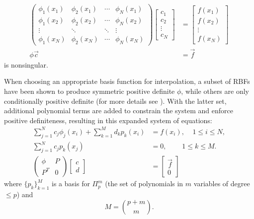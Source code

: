 \documentclass{report}
\begin{document}
{\begin{align*}
          \begin{pmatrix}  
            \phi_1(x_1) & \phi_2(x_1) & \cdots & \phi_N(x_1) \\ 
            \phi_1(x_2) & \phi_2(x_2) & \cdots & \phi_N(x_2) \\ 
            \vdots & \ddots & \ddots & \vdots \\
            \phi_1(x_N) & \phi_2(x_N) & \cdots & \phi_N(x_N)
                \end{pmatrix} 
                \begin{bmatrix} c_1 \\ c_2 \\ \vdots \\ c_N \end{bmatrix}
               &=                \begin{bmatrix} f(x_1) \\ f(x_2) \\ \vdots \\ f(x_N) \end{bmatrix} \\
                         \phi \vec{c} &= \vec{f} 
        \end{align*} 
is nonsingular.

 When choosing an appropriate basis function for interpolation, a
    subset of RBFs have been shown to produce symmetric positive definite
    $\phi$, while others are only conditionally positive definite (for more details see
    \cite{Fasshauer2007}).  With
    the latter set, additional polynomial terms are added to constrain the
    system and enforce positive definiteness, resulting in this expanded system of equations: 
        \begin{align} 
        \sum_{j=1}^{N} c_j \phi_j(x_i) + \sum_{k=1}^{M}d_k p_k(x_i) &= f(x_i),\ \ \ \ \ 1
        \leq i \leq N, \nonumber \\ 
        \sum_{j=1}^{N} c_j p_k(x_j) &=  0,\ \ \ \ \ \ \ \ \ \ 1 \leq k \leq M. \nonumber \\
          \begin{pmatrix} \phi & P \\ P^T & 0 \end{pmatrix} \begin{bmatrix} c \\ d \end{bmatrix} &= \begin{bmatrix} \vec{f} \\ 0 \end{bmatrix}
	\label{eq:additional_constraints}
        \end{align} 
        where $\{p_k\}_{k=1}^{M}$ is a basis for $\Pi_{p}^{m} $ (the set of polynomials in $m$ variables of degree $\leq p$) and 
       \begin{equation*}
       M = {{p+m}\choose{m}}       .
       \end{equation*} 


}
\end{document}

